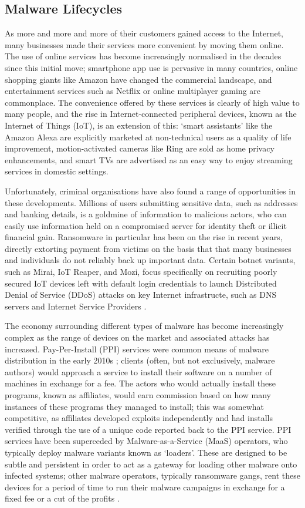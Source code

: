 \documentclass[10pt,sigconf]{acmart}
\begin{document}
\subsection{Malware Lifecycles}

As more and more and more of their customers gained access to the Internet, many businesses made their services more convenient by moving them online.
The use of online services has become increasingly normalised in the decades since this initial move;
smartphone app use is pervasive in many countries, online shopping giants like Amazon have changed the commercial landscape, and entertainment services such as Netflix or online multiplayer gaming are commonplace.
The convenience offered by these services is clearly of high value to many people, and the rise in Internet-connected peripheral devices, known as the Internet of Things (IoT), is an extension of this:
`smart assistants' like the Amazon Alexa are explicitly marketed at non-technical users as a quality of life improvement, motion-activated cameras like Ring are sold as home privacy enhancements, and smart TVs are advertised as an easy way to enjoy streaming services in domestic settings.

Unfortunately, criminal organisations have also found a range of opportunities in these developments.
Millions of users submitting sensitive data, such as addresses and banking details, is a goldmine of information to malicious actors, who can easily use information held on a compromised server for identity theft or illicit financial gain.
Ransomware in particular has been on the rise in recent years, directly extorting payment from victims on the basis that that many businesses and individuals do not reliably back up important data.
Certain botnet variants, such as Mirai, IoT Reaper, and Mozi, focus specifically on recruiting poorly secured IoT devices left with default login credentials to launch Distributed Denial of Service (DDoS) attacks on key Internet infrastructe, such as DNS servers and Internet Service Providers \cite{antonakakris2017}.

The economy surrounding different types of malware has become increasingly complex as the range of devices on the market and associated attacks has increased.
Pay-Per-Install (PPI) services were common means of malware distribution in the early 2010s \cite{ppi};
clients (often, but not exclusively, malware authors) would approach a service to install their software on a number of machines in exchange for a fee.
The actors who would actually install these programs, known as affiliates, would earn commission based on how many instances of these programs they managed to install;
this was somewhat competitive, as affiliates developed exploits independently and had installs verified through the use of a unique code reported back to the PPI service.
PPI services have been superceded by Malware-as-a-Service (MaaS) operators, who typically deploy malware variants known as `loaders'.
These are designed to be subtle and persistent in order to act as a gateway for loading other malware onto infected systems;
other malware operators, typically ransomware gangs, rent these devices for a period of time to run their malware campaigns in exchange for a fixed fee or a cut of the profits \cite{emotet-lease}.
\end{document}
